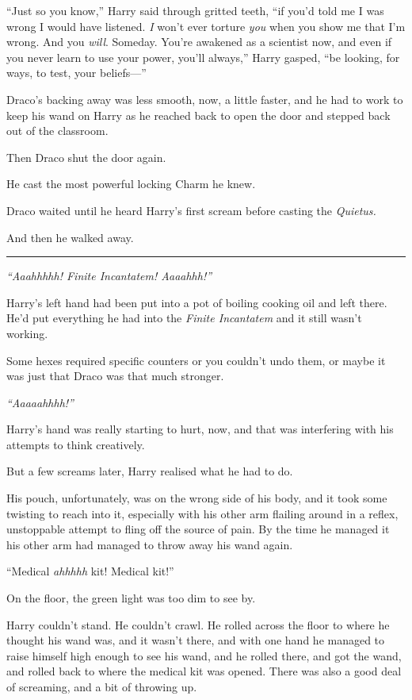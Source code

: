 ``Just so you know,'' Harry said through gritted teeth, ``if you'd told
me I was wrong I would have listened. \emph{I} won't ever torture
\emph{you} when you show me that I'm wrong. And you \emph{will}.
Someday. You're awakened as a scientist now, and even if you never learn
to use your power, you'll always,'' Harry gasped, ``be looking, for
ways, to test, your beliefs---''

Draco's backing away was less smooth, now, a little faster, and he had
to work to keep his wand on Harry as he reached back to open the door
and stepped back out of the classroom.

Then Draco shut the door again.

He cast the most powerful locking Charm he knew.

Draco waited until he heard Harry's first scream before casting the
\emph{Quietus.}

And then he walked away.

\begin{center}\rule{3in}{0.4pt}\end{center}

\emph{``Aaahhhhh! Finite Incantatem! Aaaahhh!''}

Harry's left hand had been put into a pot of boiling cooking oil and
left there. He'd put everything he had into the \emph{Finite Incantatem}
and it still wasn't working.

Some hexes required specific counters or you couldn't undo them, or
maybe it was just that Draco was that much stronger.

\emph{``Aaaaahhhh!''}

Harry's hand was really starting to hurt, now, and that was interfering
with his attempts to think creatively.

But a few screams later, Harry realised what he had to do.

His pouch, unfortunately, was on the wrong side of his body, and it took
some twisting to reach into it, especially with his other arm flailing
around in a reflex, unstoppable attempt to fling off the source of pain.
By the time he managed it his other arm had managed to throw away his
wand again.

``Medical \emph{ahhhhh} kit! Medical kit!''

On the floor, the green light was too dim to see by.

Harry couldn't stand. He couldn't crawl. He rolled across the floor to
where he thought his wand was, and it wasn't there, and with one hand he
managed to raise himself high enough to see his wand, and he rolled
there, and got the wand, and rolled back to where the medical kit was
opened. There was also a good deal of screaming, and a bit of throwing
up.

